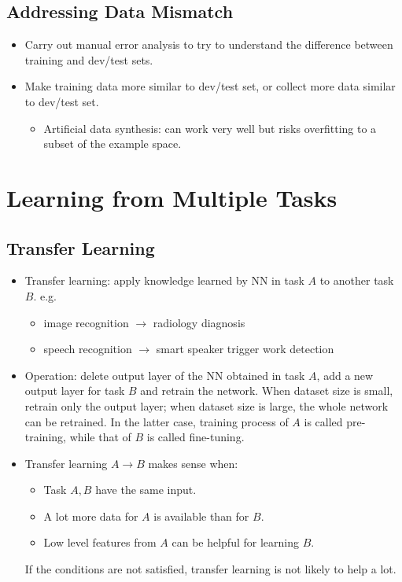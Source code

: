 \subsection{Addressing Data Mismatch}
\begin{itemize}
\item Carry out manual error analysis to try to understand the difference between training and dev/test sets.
\item Make training data more similar to dev/test set, or collect more data similar to dev/test set.
\begin{itemize}
  \item Artificial data synthesis: can work very well but risks overfitting to a subset of the example space.
\end{itemize}
\end{itemize}
\section{Learning from Multiple Tasks}
\subsection{Transfer Learning}
\begin{itemize}
  \item Transfer learning: apply knowledge learned by NN in task $A$ to another task $B$. e.g.
  \begin{itemize}
    \item image recognition $\rightarrow$ radiology diagnosis
    \item speech recognition $\rightarrow$ smart speaker trigger work detection
  \end{itemize}
  \item Operation: delete output layer of the NN obtained in task $A$, add a new output layer for task $B$ and retrain the network. When dataset size is small, retrain only the output layer; when dataset size is large, the whole network can be retrained. In the latter case, training process of $A$ is called pre-training, while that of $B$ is called fine-tuning.
  \item Transfer learning $A\rightarrow B$ makes sense when:
  \begin{itemize}
    \item Task $A,B$ have the same input.
    \item A lot more data for $A$ is available than for $B$.
    \item Low level features from $A$ can be helpful for learning $B$.
  \end{itemize}
  If the conditions are not satisfied, transfer learning is not likely to help a lot. 
\end{itemize}
